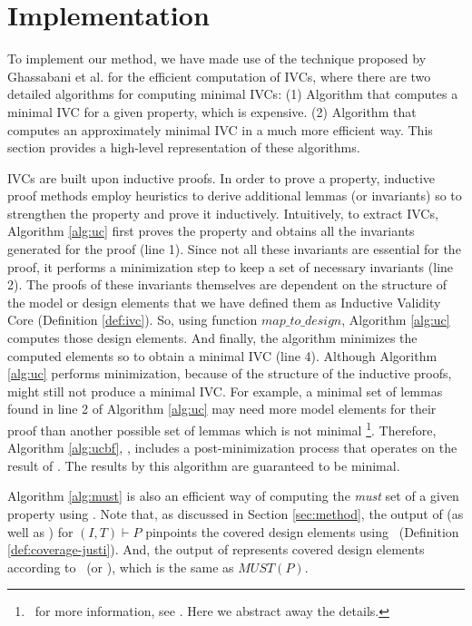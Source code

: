 \section{Implementation}
\label{sec:impl}

To implement our method, we have made use of the technique proposed by Ghassabani et al. \cite{Ghass16} for the efficient computation of IVCs, where there are two detailed algorithms for computing minimal IVCs: (1) Algorithm \ucbfalg that computes a minimal IVC for a given property, which is expensive. (2) Algorithm \ucalg that computes an approximately minimal IVC in a much more efficient way. This section provides a high-level representation of these algorithms.

IVCs are built upon inductive proofs. In order to prove a property, inductive proof methods employ heuristics to derive additional lemmas (or invariants) so to strengthen the property and prove it inductively. Intuitively, to extract IVCs, Algorithm \ref{alg:uc}
first proves the property and obtains all the invariants generated for the proof (line 1). Since not all these invariants are essential for the proof, it performs a minimization step to keep a set of necessary invariants (line 2). The proofs of these invariants themselves are dependent on the structure of the model or design elements that we have defined them as Inductive Validity Core (Definition \ref{def:ivc}).
So, using function $map\_to\_design$, Algorithm \ref{alg:uc}
computes those design elements. And finally, the algorithm minimizes the computed elements so to obtain a minimal IVC (line 4). Although Algorithm \ref{alg:uc} performs minimization, because of the structure of the inductive proofs, \ucalg might still not produce a minimal IVC. For example, a minimal set of lemmas found in line 2 of Algorithm \ref{alg:uc} may need more model elements for their proof than another possible set of lemmas which is not minimal \footnote{\noindent ~for more information, see \cite{Ghass16}. Here we abstract away the details.}.
Therefore, Algorithm \ref{alg:ucbf}, \ucbfalg, includes a post-minimization process that
operates on the result of \ucalg. The results by this algorithm are guaranteed to be minimal.

Algorithm \ref{alg:must} is also an efficient way of computing the \emph{must} set of a given property using \ucalg. Note that, as discussed in Section \ref{sec:method}, the
output of \ucalg (as well as \ucbfalg) for $(I, T) \vdash P$ pinpoints the covered design elements
using \ivccov\ (Definition \ref{def:coverage-justi}).
And, the output of \mustalg represents covered design elements according to \nondetcovalt\ (or \nondetcov ), which is the same as $MUST(P)$.

